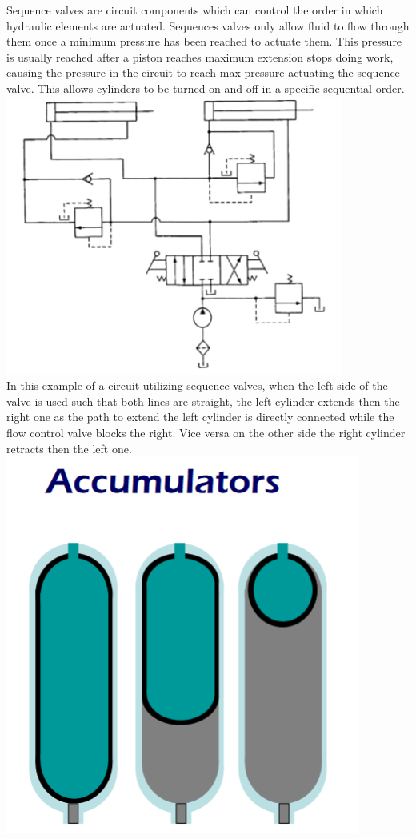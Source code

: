 \documentclass[11pt, fleqn]{article}
\begin{document}
Sequence valves are circuit components which can control the order in which hydraulic elements are actuated. Sequences valves only allow fluid to flow through them once a minimum pressure has been reached to actuate them. This pressure is usually reached after a piston reaches maximum extension stops doing work, causing the pressure in the circuit to reach max pressure actuating the sequence valve. This allows cylinders to be turned on and off in a specific sequential order.
\includegraphics[scale=1]{Fluids/sequencecircuit.png}\\


In this example of a circuit utilizing sequence valves, when the left side of the valve is used such that both lines are straight, the left cylinder extends then the right one as the path to extend the left cylinder is directly connected while the flow control valve blocks the right. Vice versa on the other side the right cylinder retracts then the left one.\\
 
\includegraphics[scale=1]{Fluids/accumulators.png}
\end{document}
